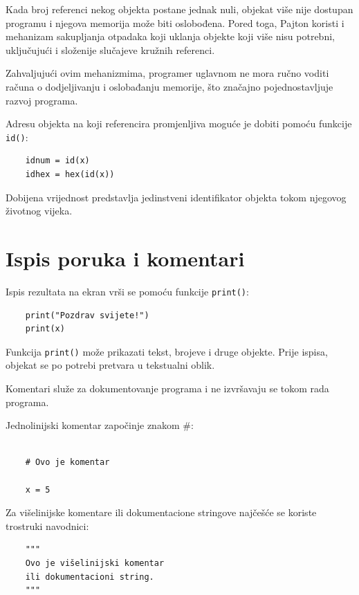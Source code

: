  Kada broj referenci nekog objekta postane jednak nuli, objekat više nije dostupan programu i njegova memorija može biti oslobođena. Pored toga, Pajton koristi i mehanizam sakupljanja otpadaka koji uklanja objekte koji više nisu potrebni, uključujući i složenije slučajeve kružnih referenci.
 
 Zahvaljujući ovim mehanizmima, programer uglavnom ne mora ručno voditi računa o dodjeljivanju i oslobađanju memorije, što značajno pojednostavljuje razvoj programa.
 
 Adresu objekta na koji referencira promjenljiva moguće je dobiti pomoću funkcije \texttt{id()}:
 
 \begin{verbatim}
 	idnum = id(x)
 	idhex = hex(id(x))
 \end{verbatim}
 
 Dobijena vrijednost predstavlja jedinstveni identifikator objekta tokom njegovog životnog vijeka.
 
\section{Ispis poruka i komentari}
 
 Ispis rezultata na ekran vrši se pomoću funkcije \texttt{print()}:
 
 \begin{verbatim}
 	print("Pozdrav svijete!")
 	print(x)
 \end{verbatim}
 
 Funkcija \texttt{print()} može prikazati tekst, brojeve i druge objekte. Prije ispisa, objekat se po potrebi pretvara u tekstualni oblik.
 
 Komentari služe za dokumentovanje programa i ne izvršavaju se tokom rada programa.
 
 Jednolinijski komentar započinje znakom {\#}:
 
 \begin{verbatim}
 	
 	# Ovo je komentar
 	
 	x = 5
 \end{verbatim}
 
 Za višelinijske komentare ili dokumentacione stringove najčešće se koriste trostruki navodnici:
 
 \begin{verbatim}
 	"""
 	Ovo je višelinijski komentar
 	ili dokumentacioni string.
 	"""
 \end{verbatim}
 
